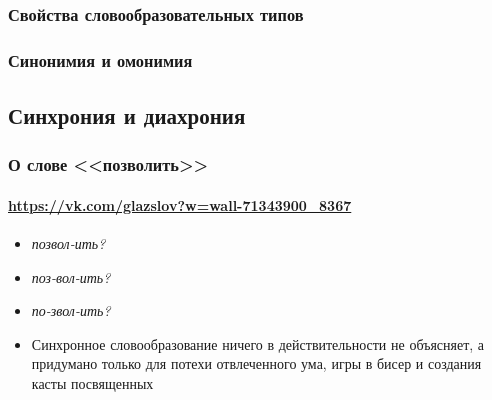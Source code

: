 \begin{frame}
    \frametitle{Свойства словообразовательных типов}
\end{frame}

\begin{frame}
    \frametitle{Синонимия и омонимия}
\end{frame}

\subsection{Синхрония и диахрония}


\begin{frame}
    \frametitle{О слове <<позволить>>}
    \framesubtitle{\url{https://vk.com/glazslov?w=wall-71343900_8367}}

    \begin{itemize}
        \item \textit{позвол-ить?}
        \item \textit{поз-вол-ить?}
        \item \textit{по-звол-ить?}
        \item<5-> Синхронное словообразование ничего в действительности не объясняет, а придумано только для потехи отвлеченного ума, игры в бисер и создания касты посвященных
    \end{itemize}
\end{frame}

